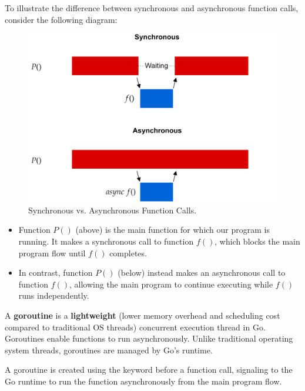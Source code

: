 \noindent
To illustrate the difference between synchronous and asynchronous function calls, consider the following diagram:

\begin{figure}[h]
    \centering
    \includegraphics[width=1\textwidth]{Sections/rpc/Async.png}
    \caption{Synchronous vs. Asynchronous Function Calls.}
    \label{fig:sync_async}
\end{figure}

\noindent
\begin{itemize}
\item Function $P()$ (above) is the main function for which our program is running. It makes a synchronous call to function $f()$, which blocks the main program flow until $f()$ completes.
\item In contrast, function $P()$ (below) instead makes an asynchronous call to function $f()$, allowing the main program to continue executing while $f()$ runs independently.
\end{itemize}

\noindent
\begin{Def}

    A \textbf{goroutine} is a \textbf{lightweight} (lower memory overhead and scheduling cost compared to traditional OS threads)
    concurrent execution thread in Go. Goroutines enable functions to run asynchronously. Unlike traditional operating system threads, goroutines are managed by Go's runtime.
    
    A goroutine is created using the  keyword before a function call, signaling to the Go runtime to run the function asynchronously from the main program flow.
    
\end{Def}

